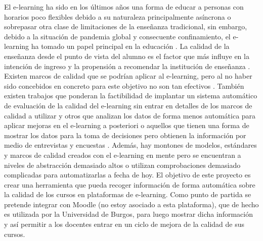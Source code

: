 
El e-learning ha sido en los últimos años una forma de educar a personas con horarios poco flexibles debido a su naturaleza principalmente asíncrona o sobrepasar otra clase de limitaciones de la enseñanza tradicional, sin embargo, debido a la situación de pandemia global y consecuente confinamiento, el e-learning ha tomado un papel principal en la educación \cite{muhammad2020hierarchical}.
La calidad de la enseñanza desde el punto de vista del alumno es el factor que más influye en la intención de ingreso y la propensión a recomendar la institución de enseñanza \cite{martinez2016perceived}.
Existen marcos de calidad que se podrían aplicar al e-learning, pero al no haber sido concebidos en concreto para este objetivo no son tan efectivos \cite{muhammad2020hierarchical}.
También existen trabajos que ponderan la factibilidad de implantar un sistema automático de evaluación de la calidad del e-learning sin entrar en detalles de los marcos de calidad a utilizar \cite{doneva2015automated} y otros que analizan los datos de forma menos automática para aplicar mejoras en el e-learning a posteriori \cite{ueda2017data} o aquellos que tienen una forma de mostrar los datos para la toma de decisiones pero obtienen la información por medio de entrevistas y encuestas \cite{mejia2020dashboard}.
Además, hay montones de modelos, estándares y marcos de calidad creados con el e-learning en mente pero se encuentran a niveles de abstracción demasiado altos o utilizan comprobaciones demasiado complicadas para automatizarlas a fecha de hoy.
El objetivo de este proyecto es crear una herramienta que pueda recoger información de forma automática sobre la calidad de los cursos en plataformas de e-learning. Como punto de partida se pretende integrar con Moodle (no estoy asociado a esta plataforma), que de hecho es utilizada por la Universidad de Burgos, para luego mostrar dicha información y así permitir a los docentes entrar en un ciclo de mejora de la calidad de sus cursos.
